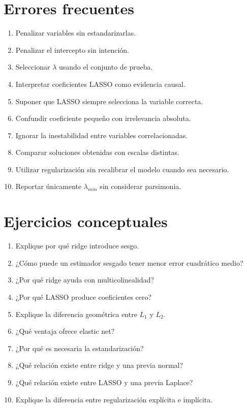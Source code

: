 \documentclass[
  spanish,
  11pt,
  letterpaper,
  DIV=11,
  numbers=noendperiod]{scrreprt}
\providecommand{\tightlist}{%
  \setlength{\itemsep}{0pt}\setlength{\parskip}{0pt}}
\theoremstyle{definition}
\theoremstyle{plain}
\theoremstyle{definition}
\theoremstyle{remark}
\begin{document}
\section{Errores frecuentes}\label{errores-frecuentes-7}

\begin{enumerate}
\def\labelenumi{\arabic{enumi}.}
\tightlist
\item
  Penalizar variables sin estandarizarlas.
\item
  Penalizar el intercepto sin intención.
\item
  Seleccionar \(\lambda\) usando el conjunto de prueba.
\item
  Interpretar coeficientes LASSO como evidencia causal.
\item
  Suponer que LASSO siempre selecciona la variable correcta.
\item
  Confundir coeficiente pequeño con irrelevancia absoluta.
\item
  Ignorar la inestabilidad entre variables correlacionadas.
\item
  Comparar soluciones obtenidas con escalas distintas.
\item
  Utilizar regularización sin recalibrar el modelo cuando sea necesario.
\item
  Reportar únicamente \(\lambda_{min}\) sin considerar parsimonia.
\end{enumerate}

\section{Ejercicios conceptuales}\label{ejercicios-conceptuales-7}

\begin{enumerate}
\def\labelenumi{\arabic{enumi}.}
\tightlist
\item
  Explique por qué ridge introduce sesgo.
\item
  ¿Cómo puede un estimador sesgado tener menor error cuadrático medio?
\item
  ¿Por qué ridge ayuda con multicolinealidad?
\item
  ¿Por qué LASSO produce coeficientes cero?
\item
  Explique la diferencia geométrica entre \(L_1\) y \(L_2\).
\item
  ¿Qué ventaja ofrece elastic net?
\item
  ¿Por qué es necesaria la estandarización?
\item
  ¿Qué relación existe entre ridge y una previa normal?
\item
  ¿Qué relación existe entre LASSO y una previa Laplace?
\item
  Explique la diferencia entre regularización explícita e implícita.
\end{enumerate}
\end{document}
